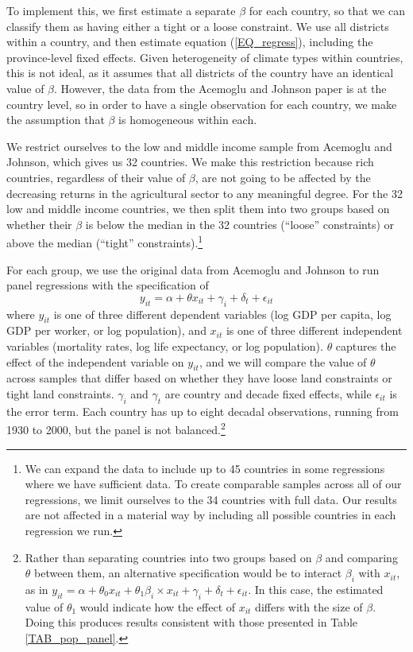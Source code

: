 \documentclass[11pt]{article}
\begin{document}
To implement this, we first estimate a separate $\beta$ for each country, so that we can classify them as having either a tight or a loose constraint. We use all districts within a country, and then estimate equation (\ref{EQ_regress}), including the province-level fixed effects. Given heterogeneity of climate types within countries, this is not ideal, as it assumes that all districts of the country have an identical value of $\beta$. However, the data from the Acemoglu and Johnson paper is at the country level, so in order to have a single observation for each country, we make the assumption that $\beta$ is homogeneous within each.

We restrict ourselves to the low and middle income sample from Acemoglu and Johnson, which gives us 32 countries. We make this restriction because rich countries, regardless of their value of $\beta$, are not going to be affected by the decreasing returns in the agricultural sector to any meaningful degree. For the 32 low and middle income countries, we then split them into two groups based on whether their $\beta$ is below the median in the 32 countries (``loose'' constraints) or above the median (``tight'' constraints).\footnote{We can expand the data to include up to 45 countries in some regressions where we have sufficient data. To create comparable samples across all of our regressions, we limit ourselves to the 34 countries with full data. Our results are not affected in a material way by including all possible countries in each regression we run.}

For each group, we use the original data from Acemoglu and Johnson to run panel regressions with the specification of
\begin{equation}
    y_{it} = \alpha + \theta x_{it} + \gamma_i + \delta_t + \epsilon_{it}
\end{equation}
where $y_{it}$ is one of three different dependent variables (log GDP per capita, log GDP per worker, or log population), and $x_{it}$ is one of three different independent variables (mortality rates, log life expectancy, or log population). $\theta$ captures the effect of the independent variable on $y_{it}$, and we will compare the value of $\theta$ across samples that differ based on whether they have loose land constraints or tight land constraints. $\gamma_i$ and $\gamma_t$ are country and decade fixed effects, while $\epsilon_{it}$ is the error term. Each country has up to eight decadal observations, running from 1930 to 2000, but the panel is not balanced.\footnote{Rather than separating countries into two groups based on $\beta$ and comparing $\theta$ between them, an alternative specification would be to interact $\beta_i$ with $x_{it}$, as in $y_{it} = \alpha + \theta_0 x_{it} + \theta_1 \beta_i \times x_{it} + \gamma_i + \delta_t + \epsilon_{it}$. In this case, the estimated value of $\theta_1$ would indicate how the effect of $x_{it}$ differs with the size of $\beta$. Doing this produces results consistent with those presented in Table \ref{TAB_pop_panel}.}
\end{document}
